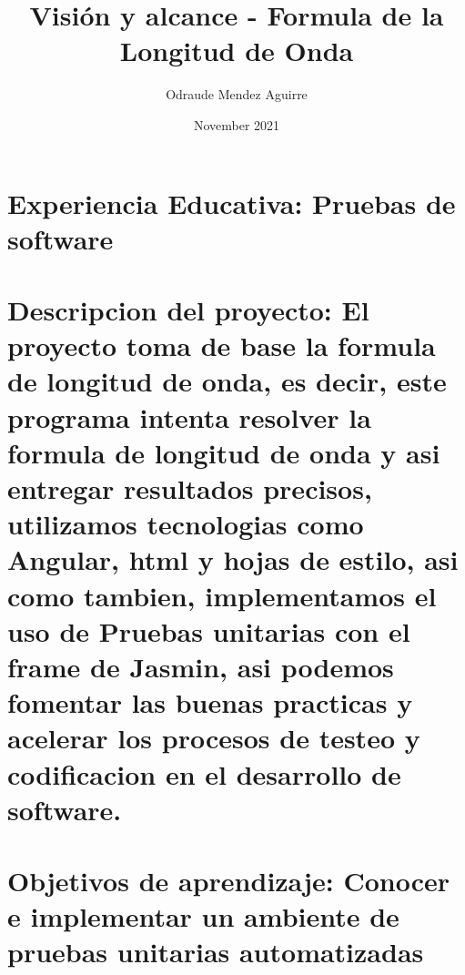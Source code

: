 \documentclass{article}
\title{Visión y alcance - Formula de la Longitud de Onda}
\author{Odraude Mendez Aguirre}
\date{November 2021}
\begin{document}
\maketitle
\section{Experiencia Educativa: Pruebas de software}
\section{Descripcion del proyecto: El proyecto toma de base la formula de longitud de onda, es decir, este programa intenta resolver la formula de longitud de onda y asi entregar resultados precisos, utilizamos tecnologias como Angular, html y hojas de estilo, asi como tambien, implementamos el uso de Pruebas unitarias con el frame de Jasmin, asi podemos fomentar las buenas practicas y acelerar los procesos de testeo y codificacion en el desarrollo de software.}
\section{Objetivos de aprendizaje: Conocer e implementar un ambiente de pruebas unitarias automatizadas}
\end{document}
